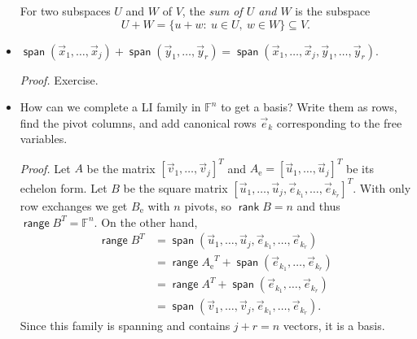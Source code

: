 \documentclass[11pt]{article}
\newcommand{\1}{\mathbf{1}}
\newcommand{\e}{{\mathrm{e}}}
\newcommand{\0}{\mathbf{0}}
\newcommand{\F}{\mathbb{F}}
\DeclareMathOperator{\myspan}{\mathsf{span}}
\DeclareMathOperator{\myrange}{\mathsf{range}}
\DeclareMathOperator{\myker}{\mathsf{ker}}
\DeclareMathOperator{\myrank}{\mathsf{rank}}
\newcommand{\ve}{\vec{e}}
\newcommand{\vx}{\vec{x}}
\newcommand{\vy}{\vec{y}}
\newcommand{\vu}{\vec{u}}
\newcommand{\vv}{\vec{v}}
\newcommand{\vw}{\vec{w}}
\newcommand{\spitem}{\item[$\circ$]}
\begin{document}
\begin{itemize}
For two subspaces $U$ and $W$ of $V$, the \emph{sum of $U$ and $W$} is the subspace
\[
U+W=\{u+w:\ u\in U, \ w\in W\} \subseteq V.
\]

\spitem

$\myspan(\vx_1,\dots,\vx_j) + \myspan(\vy_1,\dots,\vy_r) = \myspan(\vx_1,\dots,\vx_j,\vy_1,\dots,\vy_r)$.

\emph{Proof.}
Exercise.

\spitem

How can we complete a LI family in $\F^n$ to get a basis? Write them as rows, find the pivot columns, and add canonical rows ${\ve}_k$ corresponding to the free variables.

\emph{Proof.}
Let $A$ be the matrix $[\vv_1, \dots, \vv_j]^T$ and $A_\e=[\vu_1,\dots,\vu_j]^T$ be its echelon form.
Let $B$ be the square matrix $[\vu_1,\dots, \vu_j, \ve_{k_1}, \dots, \ve_{k_r}]^T$.
With only row exchanges we get $B_\e$ with $n$ pivots, so $\myrank B = n$ and thus $\myrange B^T = \F^n$.
On the other hand,
\begin{align*}
\myrange B^T
& = \myspan(\vu_1,\dots, \vu_j, \ve_{k_1}, \dots, \ve_{k_r}) \\
& = \myrange {A_\e}^T + \myspan(\ve_{k_1}, \dots, \ve_{k_r}) \\
& = \myrange A^T + \myspan(\ve_{k_1}, \dots, \ve_{k_r}) \\
& = \myspan(\vv_1,\dots, \vv_j,\ve_{k_1}, \dots, \ve_{k_r}).
\end{align*}
Since this family is spanning and contains $j+r=n$ vectors, it is a basis.


\end{itemize}
\end{document}

